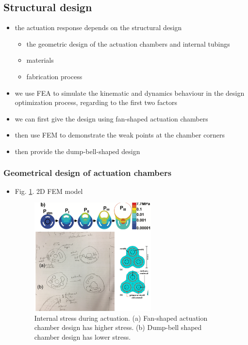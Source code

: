\documentclass[journal,onecolumn]{IEEEtran}
\begin{document}
\subsection{Structural design}
\label{sec:org7104326}
\begin{itemize}
\item the actuation response depends on the structural design
\begin{itemize}
\item the geometric design of the actuation chambers and internal tubings
\item materials
\item fabrication process
\end{itemize}
\item we use FEA to simulate the kinematic and dynamics behaviour in the design optimization process, regarding to the first two factors

\item we can first give the design using fan-shaped actuation chambers
\item then use FEM to demonstrate the weak points at the chamber corners
\item then provide the dump-bell-shaped design
\end{itemize}

\subsubsection{Geometrical design of actuation chambers}
\label{sec:org1aad666}

\begin{itemize}
\item Fig. \ref{fig:org0f1c4a7}. 2D FEM model

\begin{figure}[!h]
\centering
\includegraphics[width=0.6\textwidth]{./fig/fig-2D_fem.png}
\caption{\label{fig:org0f1c4a7}
Internal stress during actuation. (a) Fan-shaped actuation chamber design has higher stress. (b) Dump-bell shaped chamber design has lower stress.}
\end{figure}
\end{itemize}
\end{document}
